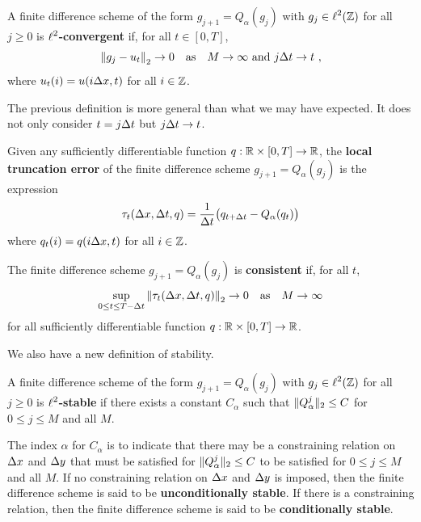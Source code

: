 \begin{defn} \label{ell2ConvDefN1}
A finite difference scheme of the form $g_{j+1} = Q_\alpha(g_j)$ with
$\displaystyle g_j \in \ell^2(\mathbb{Z})$ for all $j \geq 0$ is
{\bfseries $\displaystyle \ell^2$-convergent}
 if, for all
$t \in [0,T]$,
\[
\left\| g_j - u_t \right\|_2 \to 0
\quad \text{as} \quad M \to \infty \ \text{and} \ j\dtx{t} \to t \ ,
\]
where $\displaystyle u_t(i) = u(i \Delta{x}, t)$ for all $i \in \mathbb{Z}$.
\end{defn}

The previous definition is more general than what we may have
expected.  It does not only consider $t = j \Delta{t}$ but
$j\Delta{t} \to t$.

\begin{defn}
Given any sufficiently differentiable function $q:\mathbb{R}\times [0,T] \to \mathbb{R}$,
the {\bfseries local truncation error} of the finite difference scheme $g_{j+1} = Q_\alpha(g_j)$
is the expression
\[
\tau_t(\Delta{x},\Delta{t},q) = \frac{1}{\Delta{t}}
\big(q_{t+\Delta{t}} - Q_\alpha(q_t)\big)
\]
where $q_t(i) = q(i \Delta{x}, t)$ for all $i \in \mathbb{Z}$.

The finite difference scheme $g_{j+1} = Q_\alpha(g_j)$ is
{\bfseries consistent}
if, for all $t$,
\[
\sup_{0\leq t \leq T-\Delta t}\left\|\tau_t(\Delta{x},\Delta{t},q)\right\|_2
\rightarrow 0 \quad \text{as} \quad
M \rightarrow \infty
\]
for all sufficiently differentiable function $q:\mathbb{R}\times [0,T] \to \mathbb{R}$.
\end{defn}

We also have a new definition of stability.

\begin{defn} \label{fdmStableDefNo2}
A finite difference scheme of the form $g_{j+1} = Q_\alpha(g_j)$
with $\displaystyle g_j \in \ell^2(\mathbb{Z})$ for all $j \geq 0$ is
{\bfseries $\displaystyle \ell^2$-stable} if there exists a constant $C_\alpha$ such
that $\displaystyle \|Q_\alpha^j\|_2 \leq C$ for $0 \leq j \leq M$ and all $M$.

The index $\alpha$ for $C_\alpha$ is to indicate that there may be a
constraining relation on $\Delta{x}$ and $\Delta{y}$ that must be
satisfied for $\displaystyle \|Q_\alpha^j\|_2 \leq C$ to be satisfied for
$0 \leq j \leq M$ and all $M$.  If no
constraining relation on $\Delta{x}$ and $\Delta{y}$ is imposed, then the
finite difference scheme is said to be
{\bfseries unconditionally stable}.
If there is a constraining relation, then the finite difference scheme
is said to be {\bfseries conditionally stable}.
\end{defn}

